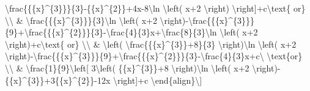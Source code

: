 \textbackslash frac\{\{\{x\}\textasciicircum\{3\}\}\}\{3\}-\{\{x\}\textasciicircum\{2\}\}+4x-8\textbackslash ln
\textbackslash left( x+2 \textbackslash right) \textbackslash right{]}+c\textbackslash text\{
or\} \textbackslash\textbackslash{} \& \textbackslash frac\{\{\{x\}\textasciicircum\{3\}\}\}\{3\}\textbackslash ln
\textbackslash left( x+2 \textbackslash right)-\textbackslash frac\{\{\{x\}\textasciicircum\{3\}\}\}\{9\}+\textbackslash frac\{\{\{x\}\textasciicircum\{2\}\}\}\{3\}-\textbackslash frac\{4\}\{3\}x+\textbackslash frac\{8\}\{3\}\textbackslash ln
\textbackslash left( x+2 \textbackslash right)+c\textbackslash text\{
or\} \textbackslash\textbackslash{} \& \textbackslash left( \textbackslash frac\{\{\{x\}\textasciicircum\{3\}\}+8\}\{3\}
\textbackslash right)\textbackslash ln \textbackslash left( x+2
\textbackslash right)-\textbackslash frac\{\{\{x\}\textasciicircum\{3\}\}\}\{9\}+\textbackslash frac\{\{\{x\}\textasciicircum\{2\}\}\}\{3\}-\textbackslash frac\{4\}\{3\}x+c\textbackslash{}
\textbackslash text\{or\} \textbackslash\textbackslash{} \& \textbackslash frac\{1\}\{9\}\textbackslash left{[}
3\textbackslash left( \{\{x\}\textasciicircum\{3\}\}+8 \textbackslash right)\textbackslash ln
\textbackslash left( x+2 \textbackslash right)-\{\{x\}\textasciicircum\{3\}\}+3\{\{x\}\textasciicircum\{2\}\}-12x
\textbackslash right{]}+c \textbackslash end\{align\}\textbackslash{]} 

